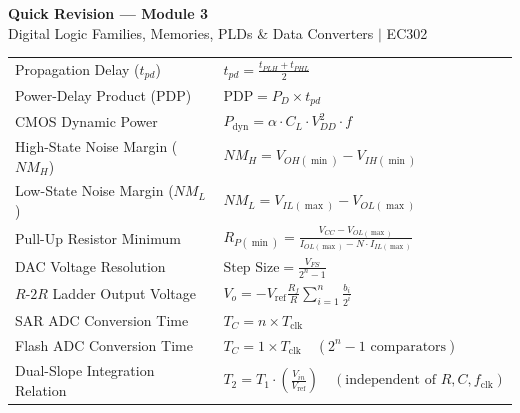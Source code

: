 \documentclass[12pt,a4paper]{article}
\renewcommand{\arraystretch}{1.45}
\begin{document}
\newpage
\begin{center}
  {\large\bfseries\color{myred} Quick Revision --- Module 3}\\[3pt]
  {\small\color{mydark} Digital Logic Families, Memories, PLDs \& Data Converters $|$ EC302}
\end{center}
\noindent{\color{myred}\rule{\linewidth}{1.2pt}}
\vspace{4pt}

\begin{tcolorbox}[formulabox, title={\textbf{Key Formulas and Metrics at a Glance}}]
\renewcommand{\arraystretch}{1.35}
\begin{tabularx}{\linewidth}{B{5.2cm} X}
Propagation Delay ($t_{pd}$) & $t_{pd} = \frac{t_{PLH} + t_{PHL}}{2}$ \\[4pt]
Power-Delay Product (PDP) & $\text{PDP} = P_D \times t_{pd}$ \\[4pt]
CMOS Dynamic Power & $P_{\text{dyn}} = \alpha \cdot C_L \cdot V_{DD}^2 \cdot f$ \\[4pt]
High-State Noise Margin ($NM_H$) & $NM_H = V_{OH(\min)} - V_{IH(\min)}$ \\[4pt]
Low-State Noise Margin ($NM_L$) & $NM_L = V_{IL(\max)} - V_{OL(\max)}$ \\[4pt]
Pull-Up Resistor Minimum & $R_{P(\min)} = \frac{V_{CC} - V_{OL(\max)}}{I_{OL(\max)} - N \cdot I_{IL(\max)}}$ \\[4pt]
DAC Voltage Resolution & $\text{Step Size} = \frac{V_{FS}}{2^n - 1}$ \\[4pt]
$R\text{-}2R$ Ladder Output Voltage & $V_o = -V_{\text{ref}} \frac{R_f}{R} \sum_{i=1}^n \frac{b_i}{2^i}$ \\[4pt]
SAR ADC Conversion Time & $T_C = n \times T_{\text{clk}}$ \\[4pt]
Flash ADC Conversion Time & $T_C = 1 \times T_{\text{clk}} \quad (2^n - 1 \text{ comparators})$ \\[4pt]
Dual-Slope Integration Relation & $T_2 = T_1 \cdot \left(\frac{V_{in}}{V_{\text{ref}}}\right) \quad (\text{independent of } R, C, f_{\text{clk}})$ \\[4pt]
\end{tabularx}
\end{tcolorbox}
\end{document}

